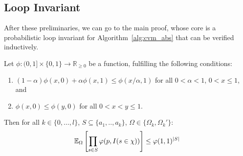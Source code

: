 \subsection{Loop Invariant}
After these preliminaries, we can go to the main proof, whose core is a probabilistic loop
invariant for Algorithm~\ref{alg:cvm_abs} that can be verified inductively.

\begin{lemma}
\label{le:neg_cor_prelim}
Let $\phi : (0,1] \times \{0,1\} \rightarrow \mathbb R_{\geq 0}$ be a function, fulfilling the following
  conditions:
\begin{enumerate}
\item \label{cond:phi_1} $(1-\alpha) \phi(x,0) + \alpha \phi(x,1) \leq \phi(x/\alpha,1)$ for all
  $0 < \alpha < 1$, $0 < x \leq 1$, and
\item \label{cond:phi_2} $\phi(x,0) \leq \phi(y,0)$ for all $0 < x < y \leq 1$.
\end{enumerate}
Then for all 
$k \in \{0,\ldots,l\}$, $S \subseteq \{a_1,..,a_k\}$, $\Omega \in \{\Omega_k,\Omega_k'\}$:
\[
  \operatorname{\mathbb E}_{\Omega}\left[ \prod_{s \in S} \varphi(p, I(s \in \chi)) \right] \leq \varphi(1,1)^{|S|} 
\]
\end{lemma}
